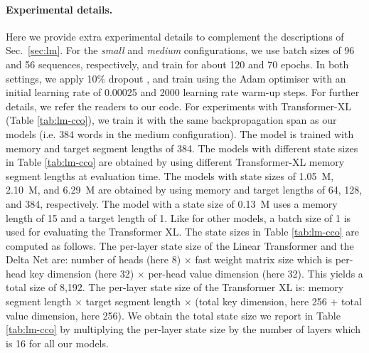 \documentclass{article}
\theoremstyle{definition}
\begin{document}
\paragraph{Experimental details.}
Here we provide extra experimental details to complement
the descriptions of Sec.~\ref{sec:lm}.
For the \textit{small} and \textit{medium} configurations,
we use batch sizes of 96 and 56 sequences, respectively,
and train for about 120 and 70 epochs.
In both settings, we apply 10\% dropout \citep{hanson1990stochastic, srivastava2014dropout},
and train using the Adam optimiser \citep{kingma2014adam} with an initial learning rate of 0.00025 and 2000 learning rate warm-up steps.
For further details, we refer the readers to our code.
For experiments with Transformer-XL (Table \ref{tab:lm-cco}),
we train it with the same backpropagation span as our models
(i.e. $384$ words in the medium configuration).
The model is trained with memory and target segment lengths
of 384.
The models with different state sizes in Table \ref{tab:lm-cco} are obtained by using different Transformer-XL memory segment lengths at evaluation time.
The models with state sizes of 1.05~M, 2.10~M, and 6.29~M are obtained
by using memory and target lengths of 64, 128, and 384, respectively.
The model with a state size of 0.13~M uses a memory length of 15 and a target length of 1.
Like for other models, a batch size of 1 is used
for evaluating the Transformer XL.
The state sizes in Table \ref{tab:lm-cco} are computed
as follows.
The per-layer state size of the Linear Transformer and the Delta Net
are: number of heads (here 8) $\times$ fast weight matrix size which is per-head key dimension
(here 32) $\times$ per-head value dimension (here 32).
This yields a total size of 8,192.
The per-layer state size of the Transformer XL is:
memory segment length $\times$ target segment length 
$\times$ (total key dimension, here 256 $+$ total value dimension, here 256).
We obtain the total state size we report in Table \ref{tab:lm-cco} by multiplying the 
per-layer state size by the number of layers which is 16 for all our models.
\end{document}
